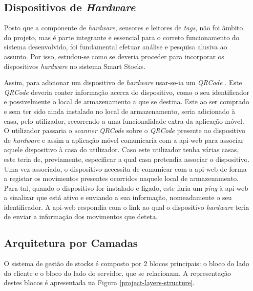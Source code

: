 %
%


\subsection{Dispositivos de \textit{Hardware}}

Posto que a componente de \textit{hardware}, sensores e leitores de \textit{tags}, não foi âmbito do projeto, mas é parte integrante e essencial para o correto funcionamento do sistema desenvolvido, foi fundamental efetuar análise e pesquisa alusiva ao assunto. Por isso, estudou-se como se deveria proceder para incorporar os dispositivos \textit{hardware} no sistema Smart Stocks. 

Assim, para adicionar um dispositivo de \textit{hardware} usar-se-ia um \textit{QRCode} \cite{qrcode:about}. Este \textit{QRCode} deveria conter informação acerca do dispositivo, como o seu identificador e possivelmente o local de armazenamento a que se destina. Este ao ser comprado e sem ter sido ainda instalado no local de armazenamento, seria adicionado à casa, pelo utilizador, recorrendo a uma funcionalidade extra da aplicação móvel. O utilizador passaria o \textit{scanner} \textit{QRCode} sobre o \textit{QRCode} presente no dispositivo de \textit{hardware} e assim a aplicação móvel comunicaria com a \gls{api-web} para associar aquele dispositivo à casa do utilizador. Caso este utilizador tenha várias casas, este teria de, previamente, especificar a qual casa pretendia associar o dispositivo. Uma vez associado, o dispositivo necessita de comunicar com a \gls{api-web} de forma a registar os movimentos presentes ocorridos naquele local de armazenamento. Para tal, quando o dispositivo for instalado e ligado, este faria um \textit{ping} à \gls{api-web} a sinalizar que está ativo e enviando a sua informação, nomeadamente o seu identificador. A \gls{api-web} respondia com o link ao qual o dispositivo \textit{hardware} teria de enviar a informação dos movimentos que deteta.

%
%
\subsection{Arquitetura por Camadas}\label{subsec232}

O sistema de gestão de stocks é composto por 2 blocos principais: o bloco do lado do cliente e o bloco do lado do servidor, que se relacionam. A representação destes blocos é apresentada na Figura \ref{project-layers-structure}.

